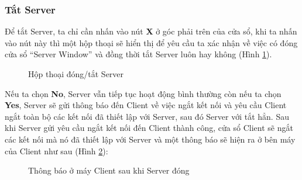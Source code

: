 \subsubsection{Tắt Server}
Để tắt Server, ta chỉ cần nhấn vào nút \textbf{X} ở góc phải trên của cửa sổ, khi ta nhấn vào nút này thì một hộp thoại sẽ hiển thị để yêu cầu ta xác nhận về việc có đóng cửa sổ ``Server Window'' và đồng thời tắt Server luôn hay không (Hình \ref{fig:ServerClosingDialog}). 

\begin{figure}[H]
	\caption{Hộp thoại đóng/tắt Server}
	\label{fig:ServerClosingDialog}
\end{figure}

Nếu ta chọn \textbf{No}, Server vẫn tiếp tục hoạt động bình thường còn nếu ta chọn \textbf{Yes}, Server sẽ gửi thông báo đến Client về việc ngắt kết nối và yêu cầu Client ngắt toàn bộ các kết nối đã thiết lập với Server, sau đó Server với tắt hẳn. Sau khi Server gửi yêu cầu ngắt kết nối đến Client thành công, cửa sổ Client sẽ ngắt các kết nối mà nó đã thiết lập với Server và một thông báo sẽ hiện ra ở bên máy của Client như sau (Hình \ref{fig:DisconnectedFromServer}):

\begin{figure}[H]
	\caption{Thông báo ở máy Client sau khi Server đóng}
	\label{fig:DisconnectedFromServer}
\end{figure}


